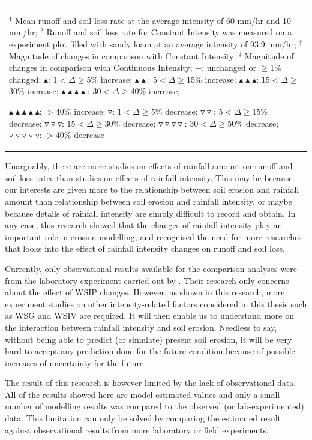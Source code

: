 \begin{table}
\begin{tabular}{llcccc}
    \bottomrule
    \multicolumn{6}{p{16cm}}{\scriptsize
    $^1$ Mean runoff and soil loss rate at the average intensity of 60 mm/hr and
10 mm/hr;
    $^2$ Runoff and soil loss rate for Constant Intensity was measured on a
experiment plot filled with sandy loam at an average intensity of 93.9 mm/hr;
    $^\dagger$ Magnitude of changes in comparison with Constant Intensity;
    $^\ddagger$ Magnitude of changes in comparison with Continuous Intensity;
    $-$: unchanged or $\geq$1\% changed;
    $\blacktriangle$: 1$<\Delta\geq$5\% increase;
    $\blacktriangle\blacktriangle$: 5$<\Delta\geq$15\% increase;
    $\blacktriangle\blacktriangle\blacktriangle$: 15$<\Delta\geq$30\%
increase;
    $\blacktriangle\blacktriangle\blacktriangle\blacktriangle$:
30$<\Delta\geq$40\% increase;

$\blacktriangle\blacktriangle\blacktriangle\blacktriangle\blacktriangle$:
$>$40\% increase;
    $\triangledown$: 1$<\Delta\geq$5\% decrease;
    $\triangledown\triangledown$: 5$<\Delta\geq$15\% decrease;
    $\triangledown\triangledown\triangledown$: 15$<\Delta\geq$30\% decrease;
    $\triangledown\triangledown\triangledown\triangledown$:
30$<\Delta\geq$50\% decrease;
    $\triangledown\triangledown\triangledown\triangledown\triangledown$:
$>$40\% decrease}\\
    \end{tabular}
\end{table}

Unarguably, there are more studies on effects of rainfall amount on runoff and
soil loss rates than studies on effects of rainfall intensity. This may be
because our interests are given more to the relationship between soil erosion
and rainfall amount than relationship between soil erosion and rainfall
intensity, or maybe because details of rainfall intensity are simply difficult
to record and obtain. In any case, this research showed that the changes of
rainfall intensity play an important role in erosion modelling, and recognised
the need for more researches that looks into the effect of rainfall intensity
changes on runoff and soil loss.

Currently, only observational results available for the comparison analyses were
from the laboratory experiment carried out by \citet{parsons2006-68}. Their
research only concerns about the effect of WSIP changes. However, as shown in
this research, more experiment studies on other intensity-related factors
considered in this thesis such as WSG and WSIV are required. It will then enable
us to understand more on the interaction between rainfall intensity and soil
erosion. Needless to say, without being able to predict (or simulate) present
soil erosion, it will be very hard to accept any prediction done for the future
condition because of possible increases of uncertainty for the future.

The result of this research is however limited by the lack of observational
data. All of the results showed here are model-estimated values and only a small
number of modelling results was compared to the observed (or lab-experimented)
data. This limitation can only be solved by comparing the estimated result
against observational results from more laboratory or field experiments.